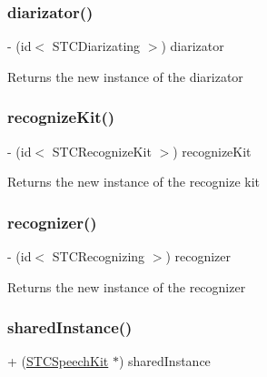 \subsubsection{\texorpdfstring{diarizator()}{diarizator()}}
{\footnotesize\ttfamily -\/ (id$<$ S\+T\+C\+Diarizating $>$) diarizator \begin{DoxyParamCaption}{ }\end{DoxyParamCaption}}

Returns the new instance of the diarizator \hypertarget{interface_s_t_c_speech_kit_ae37afef806110cd42e7cb55cb3ed1bab}{}\label{interface_s_t_c_speech_kit_ae37afef806110cd42e7cb55cb3ed1bab} 
\subsubsection{\texorpdfstring{recognize\+Kit()}{recognizeKit()}}
{\footnotesize\ttfamily -\/ (id$<$ S\+T\+C\+Recognize\+Kit $>$) recognize\+Kit \begin{DoxyParamCaption}{ }\end{DoxyParamCaption}}

Returns the new instance of the recognize kit \hypertarget{interface_s_t_c_speech_kit_abed4ce3b3fa01be3562296c1e03a46c1}{}\label{interface_s_t_c_speech_kit_abed4ce3b3fa01be3562296c1e03a46c1} 
\subsubsection{\texorpdfstring{recognizer()}{recognizer()}}
{\footnotesize\ttfamily -\/ (id$<$ S\+T\+C\+Recognizing $>$) recognizer \begin{DoxyParamCaption}{ }\end{DoxyParamCaption}}

Returns the new instance of the recognizer \hypertarget{interface_s_t_c_speech_kit_ab2173dfafaf5becc7dda35b0937dd38f}{}\label{interface_s_t_c_speech_kit_ab2173dfafaf5becc7dda35b0937dd38f} 
\subsubsection{\texorpdfstring{shared\+Instance()}{sharedInstance()}}
{\footnotesize\ttfamily + (\hyperlink{interface_s_t_c_speech_kit}{S\+T\+C\+Speech\+Kit} $\ast$) shared\+Instance \begin{DoxyParamCaption}{ }\end{DoxyParamCaption}}


